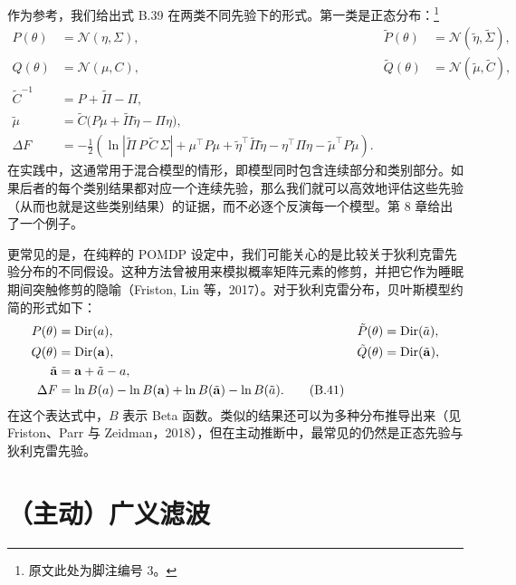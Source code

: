 作为参考，我们给出式 B.39 在两类不同先验下的形式。第一类是正态分布：\footnote{原文此处为脚注编号 3。}
\begin{align}
P(\theta) &= \mathcal{N}(\eta,\Sigma),
&
\tilde P(\theta) &= \mathcal{N}(\tilde\eta,\tilde\Sigma),
\nonumber\\
Q(\theta) &= \mathcal{N}(\mu,C),
&
\tilde Q(\theta) &= \mathcal{N}(\tilde\mu,\tilde C),
\nonumber\\
\tilde C^{-1} &= P + \tilde\Pi - \Pi,
\nonumber\\
\tilde\mu &= \tilde C\bigl(P\mu + \tilde\Pi \tilde\eta - \Pi \eta \bigr),
\nonumber\\
\Delta F
&=
-\frac{1}{2}
\left(
\ln |\tilde\Pi\, P\, \tilde C\, \Sigma|
+ \mu^\top P \mu
+ \tilde\eta^\top \tilde\Pi \tilde\eta
- \eta^\top \Pi \eta
- \tilde\mu^\top P \tilde\mu
\right).
\tag{B.40}
\end{align}
在实践中，这通常用于混合模型的情形，即模型同时包含连续部分和类别部分。如果后者的每个类别结果都对应一个连续先验，那么我们就可以高效地评估这些先验（从而也就是这些类别结果）的证据，而不必逐个反演每一个模型。第 8 章给出了一个例子。

更常见的是，在纯粹的 POMDP 设定中，我们可能关心的是比较关于狄利克雷先验分布的不同假设。这种方法曾被用来模拟概率矩阵元素的修剪，并把它作为睡眠期间突触修剪的隐喻（Friston, Lin 等，2017）。对于狄利克雷分布，贝叶斯模型约简的形式如下：
\begin{align}
P(\theta) &= \operatorname{Dir}(a),
&
\tilde P(\theta) &= \operatorname{Dir}(\tilde a),
\nonumber\\
Q(\theta) &= \operatorname{Dir}(\mathbf{a}),
&
\tilde Q(\theta) &= \operatorname{Dir}(\tilde{\mathbf{a}}),
\nonumber\\
\tilde{\mathbf{a}} &= \mathbf{a} + \tilde a - a,
\nonumber\\
\Delta F
&=
\ln B(a) - \ln B(\mathbf{a})
+ \ln B(\tilde{\mathbf{a}}) - \ln B(\tilde a).
\tag{B.41}
\end{align}
在这个表达式中，$B$ 表示 Beta 函数。类似的结果还可以为多种分布推导出来（见 Friston、Parr 与 Zeidman，2018），但在主动推断中，最常见的仍然是正态先验与狄利克雷先验。

\section{（主动）广义滤波}


